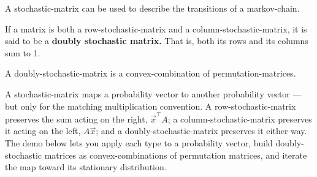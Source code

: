 \documentclass{article}
\begin{document}
\begin{note}
A \@{stochastic-matrix} can be used to describe the transitions of a \@{markov-chain}.
\end{note}

\begin{definition}
If a \@{matrix} is both a \@{row-stochastic-matrix} and a \@{column-stochastic-matrix}, it is said to be a \textbf{doubly stochastic matrix.} That is, both its rows and its columns sum to 1.
\end{definition}

\begin{note}
A \@{doubly-stochastic-matrix} is a \@{convex-combination} of \@{permutation-matrices}.
\end{note}

A \@{stochastic-matrix} maps a \@{probability vector} to another probability vector — but only for the matching multiplication convention. A \@{row-stochastic-matrix} preserves the sum acting on the right, $\vec{x}^\top A$; a \@{column-stochastic-matrix} preserves it acting on the left, $A\vec{x}$; and a \@{doubly-stochastic-matrix} preserves it either way. The demo below lets you apply each type to a probability vector, build doubly-stochastic matrices as \@{convex-combinations} of permutation matrices, and iterate the map toward its stationary distribution.

\end{document}

